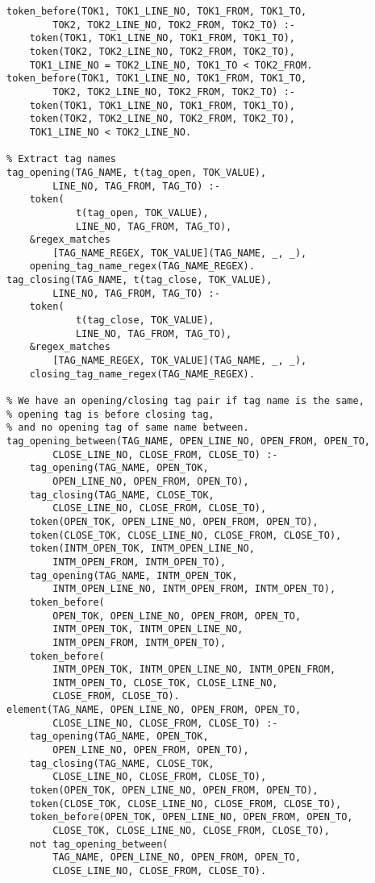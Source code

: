 \begin{lstlisting}[style=asp-code, label={lst:results-xml-parse-tag-pairs}, caption={Finding pairs of matching opening and closing XML tags.}]
% Establish a token ordering
token_before(TOK1, TOK1_LINE_NO, TOK1_FROM, TOK1_TO, 
        TOK2, TOK2_LINE_NO, TOK2_FROM, TOK2_TO) :- 
	token(TOK1, TOK1_LINE_NO, TOK1_FROM, TOK1_TO), 
	token(TOK2, TOK2_LINE_NO, TOK2_FROM, TOK2_TO), 
	TOK1_LINE_NO = TOK2_LINE_NO, TOK1_TO < TOK2_FROM.
token_before(TOK1, TOK1_LINE_NO, TOK1_FROM, TOK1_TO, 
        TOK2, TOK2_LINE_NO, TOK2_FROM, TOK2_TO) :- 
	token(TOK1, TOK1_LINE_NO, TOK1_FROM, TOK1_TO), 
	token(TOK2, TOK2_LINE_NO, TOK2_FROM, TOK2_TO), 
	TOK1_LINE_NO < TOK2_LINE_NO.

% Extract tag names
tag_opening(TAG_NAME, t(tag_open, TOK_VALUE), 
        LINE_NO, TAG_FROM, TAG_TO) :- 
	token(
            t(tag_open, TOK_VALUE), 
            LINE_NO, TAG_FROM, TAG_TO),
	&regex_matches
        [TAG_NAME_REGEX, TOK_VALUE](TAG_NAME, _, _),
	opening_tag_name_regex(TAG_NAME_REGEX).
tag_closing(TAG_NAME, t(tag_close, TOK_VALUE), 
        LINE_NO, TAG_FROM, TAG_TO) :- 
	token(
            t(tag_close, TOK_VALUE), 
            LINE_NO, TAG_FROM, TAG_TO),
	&regex_matches
        [TAG_NAME_REGEX, TOK_VALUE](TAG_NAME, _, _),
	closing_tag_name_regex(TAG_NAME_REGEX).

% We have an opening/closing tag pair if tag name is the same, 
% opening tag is before closing tag, 
% and no opening tag of same name between.
tag_opening_between(TAG_NAME, OPEN_LINE_NO, OPEN_FROM, OPEN_TO, 
        CLOSE_LINE_NO, CLOSE_FROM, CLOSE_TO) :- 
	tag_opening(TAG_NAME, OPEN_TOK, 
        OPEN_LINE_NO, OPEN_FROM, OPEN_TO),
	tag_closing(TAG_NAME, CLOSE_TOK, 
        CLOSE_LINE_NO, CLOSE_FROM, CLOSE_TO),
	token(OPEN_TOK, OPEN_LINE_NO, OPEN_FROM, OPEN_TO),
	token(CLOSE_TOK, CLOSE_LINE_NO, CLOSE_FROM, CLOSE_TO),
	token(INTM_OPEN_TOK, INTM_OPEN_LINE_NO, 
        INTM_OPEN_FROM, INTM_OPEN_TO),
	tag_opening(TAG_NAME, INTM_OPEN_TOK, 
        INTM_OPEN_LINE_NO, INTM_OPEN_FROM, INTM_OPEN_TO),
	token_before(
        OPEN_TOK, OPEN_LINE_NO, OPEN_FROM, OPEN_TO, 
        INTM_OPEN_TOK, INTM_OPEN_LINE_NO, 
        INTM_OPEN_FROM, INTM_OPEN_TO),
	token_before(
        INTM_OPEN_TOK, INTM_OPEN_LINE_NO, INTM_OPEN_FROM, 
        INTM_OPEN_TO, CLOSE_TOK, CLOSE_LINE_NO, 
        CLOSE_FROM, CLOSE_TO).
element(TAG_NAME, OPEN_LINE_NO, OPEN_FROM, OPEN_TO, 
        CLOSE_LINE_NO, CLOSE_FROM, CLOSE_TO) :- 
	tag_opening(TAG_NAME, OPEN_TOK, 
        OPEN_LINE_NO, OPEN_FROM, OPEN_TO),
	tag_closing(TAG_NAME, CLOSE_TOK, 
        CLOSE_LINE_NO, CLOSE_FROM, CLOSE_TO),
	token(OPEN_TOK, OPEN_LINE_NO, OPEN_FROM, OPEN_TO),
	token(CLOSE_TOK, CLOSE_LINE_NO, CLOSE_FROM, CLOSE_TO),
	token_before(OPEN_TOK, OPEN_LINE_NO, OPEN_FROM, OPEN_TO, 
        CLOSE_TOK, CLOSE_LINE_NO, CLOSE_FROM, CLOSE_TO),
	not tag_opening_between(
        TAG_NAME, OPEN_LINE_NO, OPEN_FROM, OPEN_TO, 
        CLOSE_LINE_NO, CLOSE_FROM, CLOSE_TO).
\end{lstlisting}    


